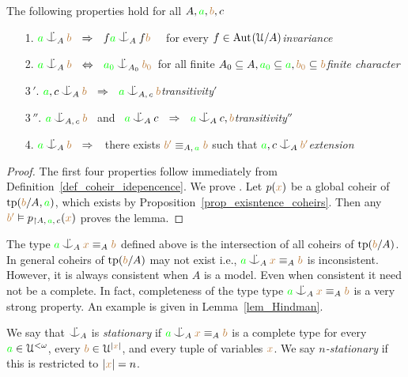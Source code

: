 \documentclass[creche.tex]{subfiles}
\begin{document}
\begin{lemma}\label{lem_coheir_independence}
The following properties hold for all $A,{\color{green} a},{\color{brown} b},c$
\begin{itemize}
\item[1.] ${\gr a}\nonforkc_A{\mr b}\ \ \IMP\ \ f{\gr a}\nonforkc_Af{\mr b}$ \ \ for every $f\in\textrm{Aut\kern.15ex}(\EuScript U/A)$\hfill \textit{invariance}
\item[2.] ${\gr a}\nonforkc_A{\mr b}\ \ \IFF\ \ {\gr a_0}\nonforkc_{A_0}{\mr b_0}$\ for all finite $A_0\subseteq A, {\color{green} a_0}\subseteq{\color{green}a}, {\color{brown} b_0}\subseteq{\color{brown}b}$\hfill \textit{finite character}
\item[3$\,'$\!.] ${\gr a},c\nonforkc_A{\mr b}\ \ \IMP\ \ {\gr a}\nonforkc_{A,\,c}{\mr b}$\hfill \textit{transitivity$'$}
\item[3$\,''$\!.] ${\gr a}\nonforkc_{A,\,c}{\mr b}$ \ and \ ${\gr a}\nonforkc_Ac\ \ \IMP\ \ {\gr a}\nonforkc_Ac,{\mr b}$\hfill \textit{transitivity$''$}
\item[4.] ${\gr a}\nonforkc_A{\mr b}\ \ \IMP\ \ $ there exists ${\color{brown} b'}\equiv_{A,\,{\color{green} a}}{\color{brown} b}$ such that ${\gr a},c\nonforkc_A{\mr b'}$\hfill \textit{extension}
\end{itemize}
\end{lemma}
\begin{proof}
The first four properties follow immediately from Definition~\ref{def_coheir_idepencence}.
We prove .
Let $p({\color{brown} x})$ be a global coheir of ${\rm tp}({\color{brown} b}/A,{\color{green} a})$, which exists by Proposition~\ref{prop_exisntence_coheirs}.
Then any ${\color{brown} b'}\vDash p_{\restriction A,\,{\color{green} a},\,c}({\color{brown} x})$ proves the lemma.
\end{proof}

The type ${\gr a}\nonforkc_A{\mr x}\equiv_A{\mr b}$ defined above is the intersection of all coheirs of ${\rm tp}({\color{brown} b}/A)$.
In general coheirs of ${\rm tp}({\color{brown} b}/A)$ may not exist i.e.,  ${\gr a}\nonforkc_A{\mr x}\equiv_A{\mr b}$ is inconsistent.
However, it is always consistent when $A$ is a model.
Even when consistent it need not be a complete.
In fact, completeness  of the type type ${\gr a}\nonforkc_A{\mr x}\equiv_A{\mr b}$ is a very strong property.
An example is given in Lemma~\ref{lem_Hindman}.

\begin{definition}\label{def_coheir_stationary}We say that $\nonforkc_A$ is \emph{stationary\/} if ${\gr a}\nonforkc_A{\mr x}\equiv_A{\mr b}$ is a complete type for every ${\color{green} a}\in\EuScript U^{<\omega}$, every ${\color{brown} b}\in\EuScript U^{|{\color{brown} x}|}$, and every tuple of variables ${\color{brown} x}$.
We say \emph{$n$-stationary\/} if this is restricted to $|{\color{brown} x}|=n$.\QED
\end{definition}
\end{document}
